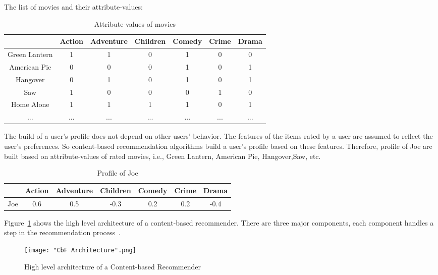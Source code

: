 \documentclass[oneside,13pt]{extreport}
\begin{document}
The list of movies and their attribute-values:
\begin{table}[h!]
    \small\centering
    \begin{tabular}{|c|c|c|c|c|c|c|}
        \hline
         & Action & Adventure & Children & Comedy & Crime & Drama   \\
        \hline
        Green Lantern & 1 & 1 & 0 & 1 & 0 & 0 \\
        \hline
        American Pie & 0 & 0 & 0 & 1 & 0 & 1 \\
        \hline
        Hangover & 0 & 1 & 0 & 1 & 0 & 1 \\
        \hline
        Saw & 1 & 0 & 0 & 0 & 1 & 0 \\
        \hline
        Home Alone & 1 & 1 & 1 & 1 & 0 & 1 \\
        \hline
        ... & ... & ... & ... & ... & ... & ... \\
        \hline
    \end{tabular}
    \caption*{Attribute-values of movies}
\end{table}

The build of a user’s profile does not depend on other users’ behavior. The features of the items rated by a user are assumed to reflect the user's preferences. So content-based recommendation algorithms build a user's profile based on these features. Therefore, profile of Joe are built based on attribute-values of rated movies, i.e., Green Lantern, American Pie, Hangover,Saw, etc.

\begin{table}[h!]
    \small\centering
    \begin{tabular}{|c|c|c|c|c|c|c|}
        \hline
         & Action & Adventure & Children & Comedy & Crime & Drama   \\
        \hline
       	Joe & 0.6 & 0.5 & -0.3 & 0.2 & 0.2 & -0.4 \\
        \hline
    \end{tabular}
    \caption*{Profile of Joe}
\end{table}


Figure~\ref{fig:CbF Architecture} shows the high level architecture of a content-based recommender. There are three major components, each component handles a step in the recommendation process~\cite{lops2011content}.
\clearpage
\begin{figure}[h!]
    \centering
    \texttt{[image: "CbF Architecture".png]} 
    \caption{High level architecture of a Content-based Recommender~\cite{lops2011content}}
    \!\!\!\!
    \label{fig:CbF Architecture}
\end{figure}
\end{document}
